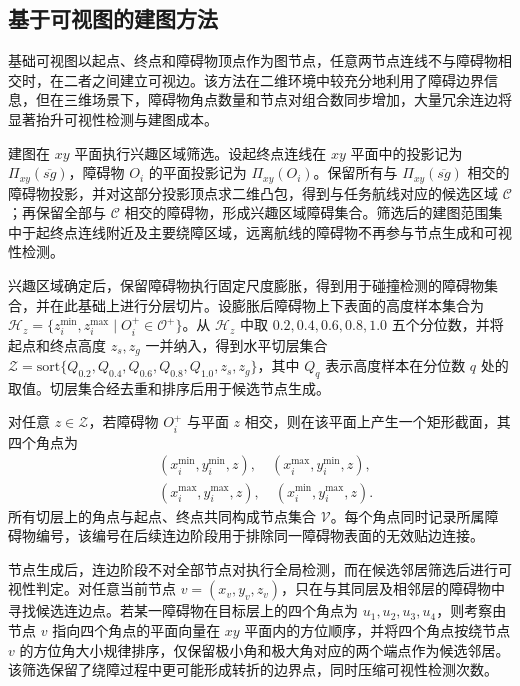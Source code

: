 \subsection{基于可视图的建图方法}

基础可视图以起点、终点和障碍物顶点作为图节点，任意两节点连线不与障碍物相交时，在二者之间建立可视边。该方法在二维环境中较充分地利用了障碍边界信息，但在三维场景下，障碍物角点数量和节点对组合数同步增加，大量冗余连边将显著抬升可视性检测与建图成本。

建图在 \(xy\) 平面执行兴趣区域筛选。设起终点连线在 \(xy\) 平面中的投影记为 \(\Pi_{xy}(\overline{sg})\)，障碍物 \(O_i\) 的平面投影记为 \(\Pi_{xy}(O_i)\)。保留所有与 \(\Pi_{xy}(\overline{sg})\) 相交的障碍物投影，并对这部分投影顶点求二维凸包，得到与任务航线对应的候选区域 \(\mathcal C\)；再保留全部与 \(\mathcal C\) 相交的障碍物，形成兴趣区域障碍集合。筛选后的建图范围集中于起终点连线附近及主要绕障区域，远离航线的障碍物不再参与节点生成和可视性检测。

兴趣区域确定后，保留障碍物执行固定尺度膨胀，得到用于碰撞检测的障碍物集合，并在此基础上进行分层切片。设膨胀后障碍物上下表面的高度样本集合为 \(\mathcal H_z=\{z_i^{\min},z_i^{\max}\mid O_i^{+}\in\mathcal O^{+}\}\)。从 \(\mathcal H_z\) 中取 \(0.2,0.4,0.6,0.8,1.0\) 五个分位数，并将起点和终点高度 \(z_s,z_g\) 一并纳入，得到水平切层集合 \(\mathcal Z=\mathrm{sort}\{Q_{0.2},Q_{0.4},Q_{0.6},Q_{0.8},Q_{1.0},z_s,z_g\}\)，其中 \(Q_q\) 表示高度样本在分位数 \(q\) 处的取值。切层集合经去重和排序后用于候选节点生成。

对任意 \(z\in\mathcal Z\)，若障碍物 \(O_i^{+}\) 与平面 \(z\) 相交，则在该平面上产生一个矩形截面，其四个角点为
\[
\begin{aligned}
&(x_i^{\min},y_i^{\min},z),\quad (x_i^{\max},y_i^{\min},z),\\
&(x_i^{\max},y_i^{\max},z),\quad (x_i^{\min},y_i^{\max},z).
\end{aligned}
\]
所有切层上的角点与起点、终点共同构成节点集合 \(\mathcal V\)。每个角点同时记录所属障碍物编号，该编号在后续连边阶段用于排除同一障碍物表面的无效贴边连接。

节点生成后，连边阶段不对全部节点对执行全局检测，而在候选邻居筛选后进行可视性判定。对任意当前节点 \(v=(x_v,y_v,z_v)\)，只在与其同层及相邻层的障碍物中寻找候选连边点。若某一障碍物在目标层上的四个角点为 \(u_1,u_2,u_3,u_4\)，则考察由节点 \(v\) 指向四个角点的平面向量在 \(xy\) 平面内的方位顺序，并将四个角点按绕节点 \(v\) 的方位角大小规律排序，仅保留极小角和极大角对应的两个端点作为候选邻居。该筛选保留了绕障过程中更可能形成转折的边界点，同时压缩可视性检测次数。

